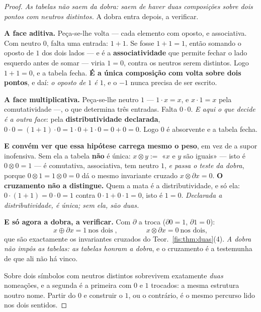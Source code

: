 \documentclass[livro.tex]{subfiles}
\begin{document}
\begin{proof}
\emph{As tabelas não saem da dobra: saem de haver duas composições sobre dois
pontos com neutros distintos.} A dobra entra depois, a verificar.

\smallskip\noindent\textbf{A face aditiva.} Peça-se-lhe volta --- cada elemento
com oposto, e associativa. Com neutro $0$, falta uma entrada: $1+1$. Se fosse
$1+1=1$, então somando o oposto de $1$ dos dois lados --- e é a
\textbf{associatividade} que permite fechar o lado esquerdo antes de somar ---
viria $1=0$, contra os neutros serem distintos. Logo $1+1=0$, e a tabela fecha.
\textbf{É a única composição com volta sobre dois pontos}, e daí: \emph{o oposto
de $1$ é $1$}, e o $-1$ nunca precisa de ser escrito.

\smallskip\noindent\textbf{A face multiplicativa.} Peça-se-lhe neutro $1$ ---
$1\cdot x=x$, e $x\cdot1=x$ pela comutatividade ---, o que determina três
entradas. Falta $0\cdot0$. \emph{E aqui o que decide é a outra face}: pela
\textbf{distributividade declarada},
$0\cdot0=(1+1)\cdot0=1\cdot0+1\cdot0=0+0=0$. Logo $0$ é absorvente e a tabela
fecha.

\smallskip\noindent\textbf{E convém ver que essa hipótese carrega mesmo o
peso}, em vez de a supor inofensiva. Sem ela a tabela \textbf{não} é única:
$x\otimes y:=$ «$x$ e $y$ são iguais» --- isto é $0\otimes0=1$ --- é
comutativa, associativa, tem neutro $1$, \emph{e passa o teste da dobra}, porque
$0\otimes1=1\otimes0=0$ dá o mesmo invariante cruzado $x\otimes\partial x=0$.
\textbf{O cruzamento não a distingue.} Quem a mata é a distributividade, e só
ela: $0\cdot(1+1)=0\cdot0=1$ contra $0\cdot1+0\cdot1=0$, isto é $1=0$.
\emph{Declarada a distributividade, é única; sem ela, são duas.}

\smallskip\noindent\textbf{E só agora a dobra, a verificar.} Com $\partial$ a
troca ($\partial0=1$, $\partial1=0$):
\[
x\oplus\partial x=1\ \text{nos dois}\;,\qquad\qquad x\otimes\partial x=0\ \text{nos dois},
\]
que são exactamente os invariantes cruzados do Teor.~\ref{fis:thm:duas}(4).
\emph{A dobra não impôs as tabelas: as tabelas honram a dobra}, e o cruzamento é
a testemunha de que ali não há vinco.

\smallskip\noindent Sobre dois símbolos com neutros distintos sobrevivem
exatamente \emph{duas} nomeações, e a segunda é a primeira com $0$ e $1$
trocados: a mesma estrutura noutro nome. Partir do $0$ e construir o $1$, ou o
contrário, é o mesmo percurso lido nos dois sentidos.
\end{proof}
\end{document}
